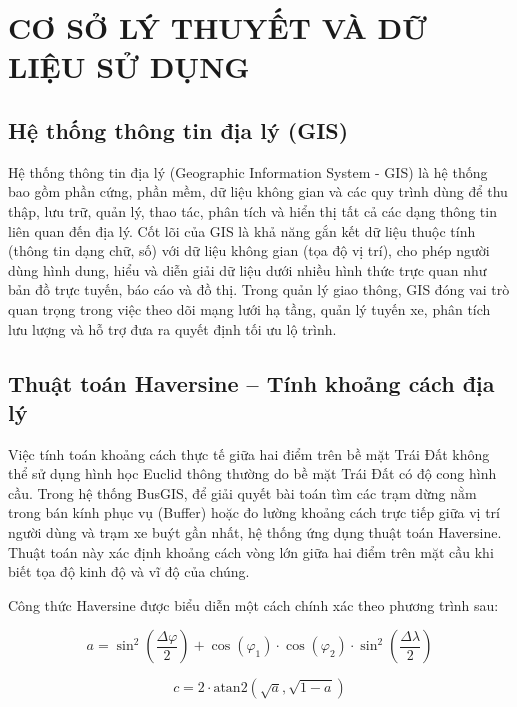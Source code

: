 \chapter{CƠ SỞ LÝ THUYẾT VÀ DỮ LIỆU SỬ DỤNG}

\section{Hệ thống thông tin địa lý (GIS)}

Hệ thống thông tin địa lý (Geographic Information System - GIS) là hệ thống bao gồm phần cứng, phần mềm, dữ liệu không gian và các quy trình dùng để thu thập, lưu trữ, quản lý, thao tác, phân tích và hiển thị tất cả các dạng thông tin liên quan đến địa lý. Cốt lõi của GIS là khả năng gắn kết dữ liệu thuộc tính (thông tin dạng chữ, số) với dữ liệu không gian (tọa độ vị trí), cho phép người dùng hình dung, hiểu và diễn giải dữ liệu dưới nhiều hình thức trực quan như bản đồ trực tuyến, báo cáo và đồ thị. Trong quản lý giao thông, GIS đóng vai trò quan trọng trong việc theo dõi mạng lưới hạ tầng, quản lý tuyến xe, phân tích lưu lượng và hỗ trợ đưa ra quyết định tối ưu lộ trình. 

\section{Thuật toán Haversine – Tính khoảng cách địa lý}

Việc tính toán khoảng cách thực tế giữa hai điểm trên bề mặt Trái Đất không thể sử dụng hình học Euclid thông thường do bề mặt Trái Đất có độ cong hình cầu. Trong hệ thống BusGIS, để giải quyết bài toán tìm các trạm dừng nằm trong bán kính phục vụ (Buffer) hoặc đo lường khoảng cách trực tiếp giữa vị trí người dùng và trạm xe buýt gần nhất, hệ thống ứng dụng thuật toán Haversine. Thuật toán này xác định khoảng cách vòng lớn giữa hai điểm trên mặt cầu khi biết tọa độ kinh độ và vĩ độ của chúng.

Công thức Haversine được biểu diễn một cách chính xác theo phương trình sau:

\begin{equation}
    a = \sin^2\left(\frac{\Delta \varphi}{2}\right) + \cos(\varphi_1) \cdot \cos(\varphi_2) \cdot \sin^2\left(\frac{\Delta \lambda}{2}\right)
\end{equation}

\begin{equation}
    c = 2 \cdot \text{atan2}\left(\sqrt{a}, \sqrt{1-a}\right)
\end{equation}

